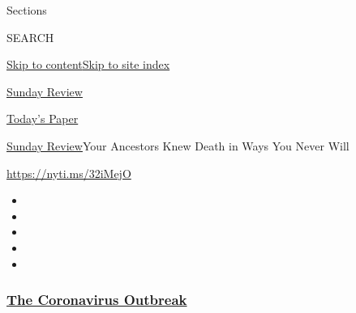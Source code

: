 Sections

SEARCH

\protect\hyperlink{site-content}{Skip to
content}\protect\hyperlink{site-index}{Skip to site index}

\href{https://www.nytimes3xbfgragh.onion/section/opinion/sunday}{Sunday
Review}

\href{https://myaccount.nytimes3xbfgragh.onion/auth/login?response_type=cookie\&client_id=vi}{}

\href{https://www.nytimes3xbfgragh.onion/section/todayspaper}{Today's
Paper}

\href{/section/opinion/sunday}{Sunday Review}\textbar{}Your Ancestors
Knew Death in Ways You Never Will

\url{https://nyti.ms/32iMejO}

\begin{itemize}
\item
\item
\item
\item
\item
\end{itemize}

\hypertarget{the-coronavirus-outbreak}{%
\subsubsection{\texorpdfstring{\href{https://www.nytimes3xbfgragh.onion/news-event/coronavirus?name=styln-coronavirus-national\&region=TOP_BANNER\&variant=undefined\&block=storyline_menu_recirc\&action=click\&pgtype=Article\&impression_id=52c561f0-e38e-11ea-81d8-93a7ced789f1}{The
Coronavirus
Outbreak}}{The Coronavirus Outbreak}}\label{the-coronavirus-outbreak}}

